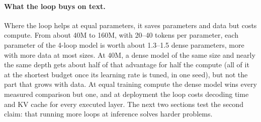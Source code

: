 \paragraph{What the loop buys on text.} Where the loop helps at equal parameters, it saves parameters and data but costs compute. From about 40M to 160M,
with 20--40 tokens per parameter, each parameter of the 4-loop model is worth about 1.3--1.5 dense parameters, more with more data at most sizes. At 40M, a dense model of the same size and nearly the same depth gets about half of that advantage for half the
compute (all of it at the shortest budget once its learning rate is tuned, in one seed), but not the part that grows
with data. At equal training compute the dense model wins every measured
comparison but one, and at deployment the loop costs decoding time and KV cache for every executed layer. The next two sections test the second
claim: that running more loops at inference solves harder problems.
